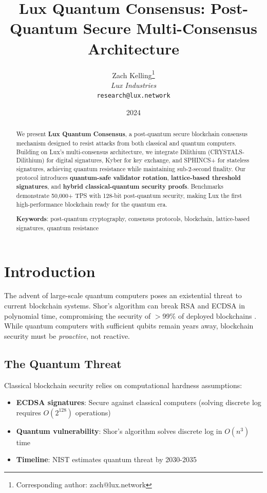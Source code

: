 \documentclass[11pt,letterpaper]{article}
\title{Lux Quantum Consensus: Post-Quantum Secure Multi-Consensus Architecture}
\author{
Zach Kelling\thanks{Corresponding author: zach@lux.network}\\
\textit{Lux Industries}\\
\texttt{research@lux.network}
}
\date{2024}
\begin{document}
\luxcoverpage
\maketitle

\begin{abstract}
We present \textbf{Lux Quantum Consensus}, a post-quantum secure blockchain consensus mechanism designed to resist attacks from both classical and quantum computers. Building on Lux's multi-consensus architecture, we integrate Dilithium (CRYSTALS-Dilithium) for digital signatures, Kyber for key exchange, and SPHINCS+ for stateless signatures, achieving quantum resistance while maintaining sub-2-second finality. Our protocol introduces \textbf{quantum-safe validator rotation}, \textbf{lattice-based threshold signatures}, and \textbf{hybrid classical-quantum security proofs}. Benchmarks demonstrate 50,000+ TPS with 128-bit post-quantum security, making Lux the first high-performance blockchain ready for the quantum era.

\textbf{Keywords}: post-quantum cryptography, consensus protocols, blockchain, lattice-based signatures, quantum resistance
\end{abstract}

\section{Introduction}

The advent of large-scale quantum computers poses an existential threat to current blockchain systems. Shor's algorithm can break RSA and ECDSA in polynomial time, compromising the security of $>$99\% of deployed blockchains \cite{shor1997}. While quantum computers with sufficient qubits remain years away, blockchain security must be \emph{proactive}, not reactive.

\subsection{The Quantum Threat}

Classical blockchain security relies on computational hardness assumptions:
\begin{itemize}
    \item \textbf{ECDSA signatures}: Secure against classical computers (solving discrete log requires $O(2^{128})$ operations)
    \item \textbf{Quantum vulnerability}: Shor's algorithm solves discrete log in $O(n^3)$ time
    \item \textbf{Timeline}: NIST estimates quantum threat by 2030-2035 \cite{nist2022}
\end{itemize}
\end{document}
